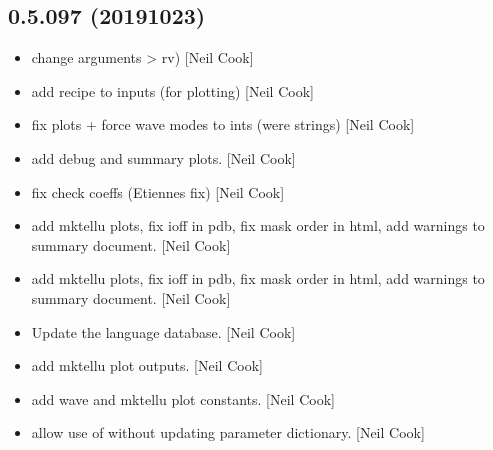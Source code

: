 \documentclass[a4paper,10pt,english]{report}
\begin{document}
\subsection{0.5.097 (2019\sphinxhyphen{}10\sphinxhyphen{}23)}
\label{\detokenize{misc/changelog:id65}}\begin{itemize}
\item {} 
 \sphinxhyphen{} change arguments  \textendash{}\textgreater{} rv) {[}Neil
Cook{]}

\item {} 
 \sphinxhyphen{} add recipe to inputs (for plotting)
{[}Neil Cook{]}

\item {} 
 \sphinxhyphen{} fix plots + force wave modes to ints (were
strings) {[}Neil Cook{]}

\item {} 
 \sphinxhyphen{} add debug and summary plots. {[}Neil
Cook{]}

\item {} 
 \sphinxhyphen{} fix check coeffs (Etiennes fix)
{[}Neil Cook{]}

\item {} 
 \sphinxhyphen{} add mktellu plots, fix ioff in pdb, fix mask order in
html, add warnings to summary document. {[}Neil Cook{]}

\item {} 
 \sphinxhyphen{} add mktellu plots, fix ioff in pdb, fix mask order in
html, add warnings to summary document. {[}Neil Cook{]}

\item {} 
Update the language database. {[}Neil Cook{]}

\item {} 
 \sphinxhyphen{} add mktellu plot
outputs. {[}Neil Cook{]}

\item {} 
 \sphinxhyphen{} add wave and mktellu plot
constants. {[}Neil Cook{]}

\item {} 
 \sphinxhyphen{} allow use of  without updating parameter
dictionary. {[}Neil Cook{]}

\end{itemize}
\end{document}
